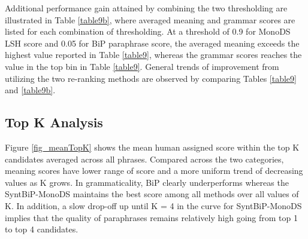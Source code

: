 \documentclass[11pt]{article}
\newcommand{\mnote}[1]{\marginpar{\raggedleft\footnotesize\itshape#1}}
\begin{document}
Additional performance gain attained by combining the two thresholding are illustrated in Table \ref{table9b}, where averaged meaning and grammar scores are listed for each combination of thresholding. At a threshold of 0.9 for MonoDS LSH score and 0.05 for BiP paraphrase score, the averaged meaning exceeds the highest value reported in Table \ref{table9}, whereas the grammar scores reaches the value in the top bin in Table \ref{table9}. General trends of improvement from utilizing the two re-ranking methods are observed by comparing Tables \ref{table9} and \ref{table9b}.


\subsection{Top K Analysis} %

Figure \ref{fig_meanTopK} shows the mean human assigned score within the top K candidates averaged across all phrases. 
Compared across the two categories, meaning scores have lower range of score and a more uniform trend of decreasing values as K grows.  In grammaticality, BiP clearly underperforms whereas the SyntBiP-MonoDS maintains the best score among all methods over all values of K. In addition, a slow drop-off up until K = 4 in the curve for SyntBiP-MonoDS implies that the quality of paraphrases remains relatively high going from top 1 to top 4 candidates.

\end{document}
